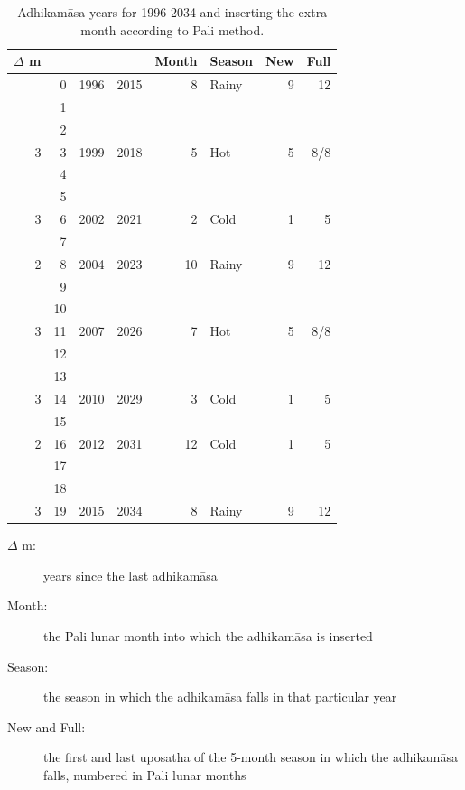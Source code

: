 \documentclass[11pt,oneside]{memoir-article}
\begin{document}
\begin{table}[h]
\caption{\label{tbl-cycle-adhikamasa} Adhikamāsa years for 1996-2034 and inserting the extra month according to Pali method.}
\centering
\begin{tabular}{rrrr|rlrr}
$\Delta$ m &  &  &  & Month & Season & New & Full\\
\hline
 & 0 & 1996 & 2015 & 8 & Rainy & 9 & 12\\
 & 1 &  &  &  &  &  & \\
 & 2 &  &  &  &  &  & \\
3 & 3 & 1999 & 2018 & 5 & Hot & 5 & 8/8\\
 & 4 &  &  &  &  &  & \\
 & 5 &  &  &  &  &  & \\
3 & 6 & 2002 & 2021 & 2 & Cold & 1 & 5\\
 & 7 &  &  &  &  &  & \\
2 & 8 & 2004 & 2023 & 10 & Rainy & 9 & 12\\
 & 9 &  &  &  &  &  & \\
 & 10 &  &  &  &  &  & \\
3 & 11 & 2007 & 2026 & 7 & Hot & 5 & 8/8\\
 & 12 &  &  &  &  &  & \\
 & 13 &  &  &  &  &  & \\
3 & 14 & 2010 & 2029 & 3 & Cold & 1 & 5\\
 & 15 &  &  &  &  &  & \\
2 & 16 & 2012 & 2031 & 12 & Cold & 1 & 5\\
 & 17 &  &  &  &  &  & \\
 & 18 &  &  &  &  &  & \\
3 & 19 & 2015 & 2034 & 8 & Rainy & 9 & 12\\
\end{tabular}
\end{table}

\begin{description}
\item[{$\Delta$ m:}] years since the last adhikamāsa
\item[{Month:}] the Pali lunar month into which the adhikamāsa is inserted
\item[{Season:}] the season in which the adhikamāsa falls in that particular year
\item[{New and Full:}] the first and last uposatha of the 5-month season in which
the adhikamāsa falls, numbered in Pali lunar months
\end{description}
\end{document}
